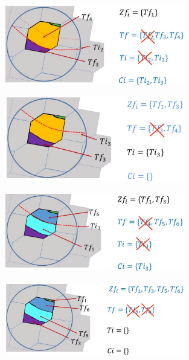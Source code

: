 	\begin{figure}[h]
		\centering
		\includegraphics[width=0.7\textwidth]{images/pseudo4}
		\caption{}
		\label{pseudo4}
	\end{figure}
	
	\begin{figure}[h]
		\centering
		\includegraphics[width=0.7\textwidth]{images/pseudo5}
		\caption{}
		\label{pseudo5}
	\end{figure}
	
	
	\begin{figure}[h]
		\centering
		\includegraphics[width=0.7\textwidth]{images/pseudo6}
		\caption{}
		\label{pseudo6}
	\end{figure}
	
\begin{figure}[h]
		\centering
		\includegraphics[width=0.7\textwidth]{images/pseudo7}
		\caption{}
		\label{pseudo7}
\end{figure}
	
